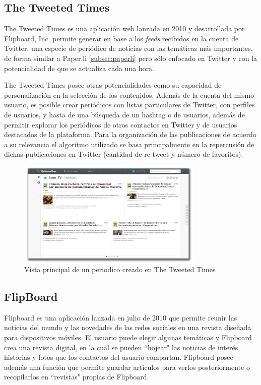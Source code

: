 \subsection{The Tweeted Times}

The Tweeted Times \cite{tweetedtimes} es una aplicación web lanzada en 2010 y desarrollada por Flipboard, Inc. permite generar en base a los \emph{feeds} recibidos en la cuenta de Twitter, una especie de periódico de noticias con las temáticas más importantes, de forma similar a Paper.li \ref{subsec:paperli} pero sólo enfocado en Twitter y con la potencialidad de que se actualiza cada una hora.

The Tweeted Times posee otras potencialidades como su capacidad de personalización en la selección de los contenidos. Además de la cuenta del mismo usuario, es posible crear periódicos con listas particulares de Twitter, con perfiles de usuarios, y hasta de una búsqueda de un hashtag o de usuarios, además de permitir explorar los periódicos de otros contactos en Twitter y de usuarios destacados de la plataforma. Para la organización de las publicaciones de acuerdo a su relevancia el algoritmo utilizado se basa principalmente en la repercusión de dichas publicaciones en Twitter (cantidad de re-tweet y número de favoritos).  

\begin{figure}[H]
	\centering
	\includegraphics[width=0.8\textwidth]{imgs/tweettimes.png}
	\caption{Vista principal de un periodico creado en The Tweeted Times}
	\label{fig:tweetedTime}
\end{figure}

\subsection{FlipBoard}

Flipboard \cite{flipboard} es una aplicación lanzada en julio de 2010 que permite reunir las noticias del mundo y las novedades de las redes sociales en una revista diseñada para dispositivos móviles. El usuario puede elegir algunas temáticas y Flipboard crea una revista digital, en la cual se pueden ``hojear" las noticias de interés, historias y fotos que los contactos del usuario compartan. Flipboard posee además una función que permite guardar artículos para verlos posteriormente o recopilarlos en ``revistas" propias de Flipboard.

